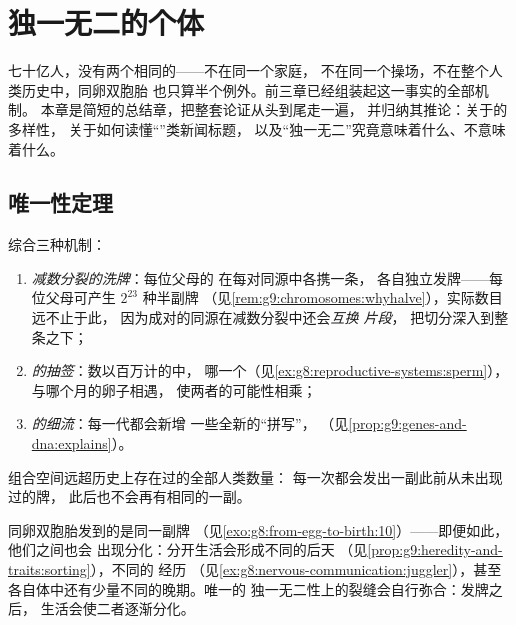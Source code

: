 \chapter{独一无二的个体}\label{ch:g9:unique-individuals}

七十亿人，没有两个相同的——不在同一个家庭，
不在同一个操场，不在整个人类历史中，同卵双胞胎
也只算半个例外。前三章已经组装起这一事实的全部机制。
本章是简短的总结章，把整套论证从头到尾走一遍，
并归纳其推论：关于的多样性，
关于如何读懂“”类新闻标题，
以及“独一无二”究竟意味着什么、不意味着什么。

\section{唯一性定理}

\begin{proposition}[为何没有两人完全相同]\label{prop:g9:unique-individuals:theorem}
综合三种机制：
\begin{enumerate}
  \item \emph{减数分裂的洗牌}：每位父母的
        在每对同源中各携一条，
        各自独立发牌——每位父母可产生 $2^{23}$ 种半副牌
        （见\cref{rem:g9:chromosomes:whyhalve}），实际数目远不止于此，
        因为成对的同源在减数分裂中还会\emph{互换
        片段}，
        把切分深入到整条之下；
  \item \emph{的抽签}：数以百万计的中，
        哪一个（见\cref{ex:g8:reproductive-systems:sperm}），
        与哪个月的卵子相遇，
        使两者的可能性相乘；
  \item \emph{的细流}：每一代都会新增
        一些全新的“拼写”，
        （见\cref{prop:g9:genes-and-dna:explains}）。
\end{enumerate}
组合空间远超历史上存在过的全部人类数量：
每一次都会发出一副此前从未出现过的牌，
此后也不会再有相同的一副。
\end{proposition}
\admitted

\begin{example}[双胞胎与例外的界限]\label{ex:g9:unique-individuals:twins}
同卵双胞胎发到的是同一副牌
（见\cref{exo:g8:from-egg-to-birth:10}）——即便如此，他们之间也会
出现分化：分开生活会形成不同的后天
（见\cref{prop:g9:heredity-and-traits:sorting}），不同的
经历
（见\cref{ex:g8:nervous-communication:juggler}），甚至
各自体中还有少量不同的晚期。唯一的
独一无二性上的裂缝会自行弥合：发牌之后，
生活会使二者逐渐分化。
\end{example}

